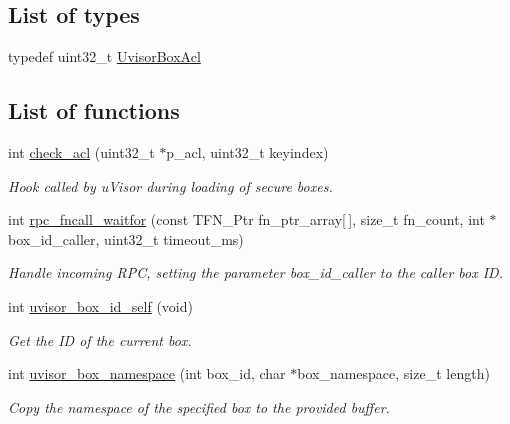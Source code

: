 \subsection*{List of types}
\begin{DoxyCompactItemize}
\item 
typedef uint32\+\_\+t \hyperlink{group__hypervisor_ga1527b3a7e3df3007490669cbd26b4fe9}{Uvisor\+Box\+Acl}
\end{DoxyCompactItemize}
\subsection*{List of functions}
\begin{DoxyCompactItemize}
\item 
int \hyperlink{group__hypervisor_ga6e7f7b03367daefa2cbcb7e4f0538ba7}{check\+\_\+acl} (uint32\+\_\+t $\ast$p\+\_\+acl, uint32\+\_\+t keyindex)
\begin{DoxyCompactList}\small\item\em Hook called by u\+Visor during loading of secure boxes. \end{DoxyCompactList}\item 
int \hyperlink{group__hypervisor_gafdaf52538986a558e934eab65221731e}{rpc\+\_\+fncall\+\_\+waitfor} (const T\+F\+N\+\_\+\+Ptr fn\+\_\+ptr\+\_\+array\mbox{[}$\,$\mbox{]}, size\+\_\+t fn\+\_\+count, int $\ast$box\+\_\+id\+\_\+caller, uint32\+\_\+t timeout\+\_\+ms)
\begin{DoxyCompactList}\small\item\em Handle incoming R\+PC, setting the parameter box\+\_\+id\+\_\+caller to the caller box ID. \end{DoxyCompactList}\item 
int \hyperlink{group__hypervisor_gab099ca7d08f626791039573dbff14af5}{uvisor\+\_\+box\+\_\+id\+\_\+self} (void)
\begin{DoxyCompactList}\small\item\em Get the ID of the current box. \end{DoxyCompactList}\item 
int \hyperlink{group__hypervisor_gab605e738e6bc828cd9efb6eacca79685}{uvisor\+\_\+box\+\_\+namespace} (int box\+\_\+id, char $\ast$box\+\_\+namespace, size\+\_\+t length)
\begin{DoxyCompactList}\small\item\em Copy the namespace of the specified box to the provided buffer. \end{DoxyCompactList}\item 

\end{DoxyCompactItemize}
